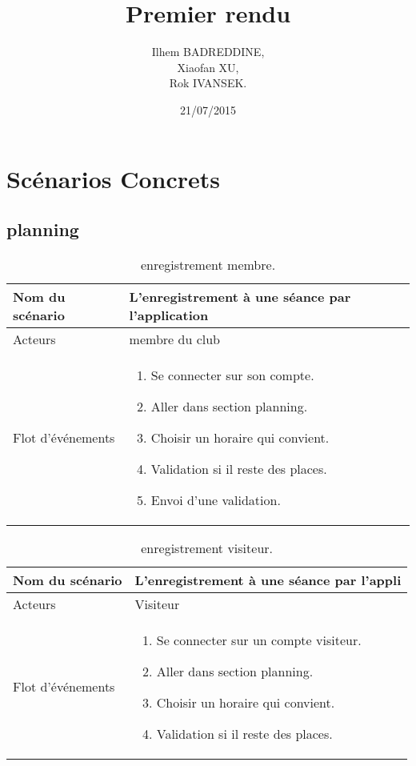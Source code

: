\documentclass{report}
\title{Premier rendu }
\author{Ilhem BADREDDINE, \\ Xiaofan XU, \\ Rok IVANSEK.}
\date{21/07/2015}
\begin{document}
\chapter{Scénarios Concrets}
\section{planning}
\begin{table}[htbp]
\begin{center}
\begin{tabular}{|L{4cm}||L{10cm}|}
\hline Nom du scénario & L'enregistrement à une séance par l'application    \\
\hline  Acteurs &  membre du club \\
\hline  Flot d'événements &  \begin{enumerate}
\item Se connecter sur son compte.
\item Aller dans section planning.
\item Choisir un horaire qui convient.
\item Validation si il reste des places.
\item Envoi d'une validation.
\end{enumerate} \\
\hline
\end{tabular}
\caption{enregistrement membre.\label{engmembre}}
\end{center}
\end{table}

\begin{table}[htbp]
\begin{center}
\begin{tabular}{|L{4cm}||L{10cm}|}
\hline Nom du scénario & L'enregistrement à une séance par l'appli    \\
\hline  Acteurs &  Visiteur \\
\hline  Flot d'événements &  \begin{enumerate}
\item Se connecter sur un compte visiteur.
\item Aller dans section planning.
\item Choisir un horaire qui convient.
\item Validation si il reste des places.
\end{enumerate}\\
\hline
\end{tabular}
\caption{enregistrement visiteur.\label{engvisit}}
\end{center}
\end{table}
\end{document}
